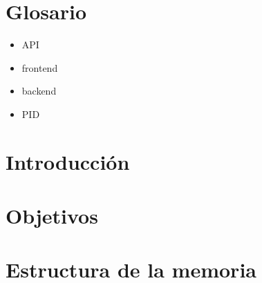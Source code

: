 \documentclass[12pt,a4paper]{article}
\begin{document}
	
	\section{Glosario}\label{glossary}
		\begin{itemize}
			\item API
			\item frontend
			\item backend
			\item PID
		\end{itemize} 
	 \section{Introducción}\label{Introduccion}
		
	\section{Objetivos}\label{Objetivos}
		
	\section{Estructura de la memoria}\label{Estructura}
		
\newpage
\end{document}
